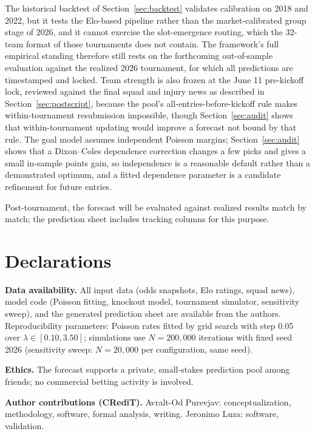 \documentclass[11pt,letterpaper]{article}
\begin{document}
The historical backtest of Section~\ref{sec:backtest} validates calibration on 2018 and 2022, but it tests the Elo-based pipeline rather than the market-calibrated group stage of 2026, and it cannot exercise the slot-emergence routing, which the 32-team format of those tournaments does not contain. The framework's full empirical standing therefore still rests on the forthcoming out-of-sample evaluation against the realized 2026 tournament, for which all predictions are timestamped and locked. Team strength is also frozen at the June 11 pre-kickoff lock, reviewed against the final squad and injury news as described in Section~\ref{sec:postscript}, because the pool's all-entries-before-kickoff rule makes within-tournament resubmission impossible, though Section~\ref{sec:audit} shows that within-tournament updating would improve a forecast not bound by that rule. The goal model assumes independent Poisson margins; Section~\ref{sec:audit} shows that a Dixon--Coles dependence correction changes a few picks and gives a small in-sample points gain, so independence is a reasonable default rather than a demonstrated optimum, and a fitted dependence parameter is a candidate refinement for future entries.

Post-tournament, the forecast will be evaluated against realized results match by match; the prediction sheet includes tracking columns for this purpose.

\section*{Declarations}

\noindent\textbf{Data availability.} All input data (odds snapshots, Elo ratings, squad news), model code (Poisson fitting, knockout model, tournament simulator, sensitivity sweep), and the generated prediction sheet are available from the authors. Reproducibility parameters: Poisson rates fitted by grid search with step 0.05 over $\lambda \in [0.10, 3.50]$; simulations use $N = 200{,}000$ iterations with fixed seed 2026 (sensitivity sweep: $N = 20{,}000$ per configuration, same seed).

\noindent\textbf{Ethics.} The forecast supports a private, small-stakes prediction pool among friends; no commercial betting activity is involved.

\noindent\textbf{Author contributions (CRediT).} Avralt-Od Purevjav: conceptualization, methodology, software, formal analysis, writing. Jeronimo Luza: software, validation.
\end{document}
